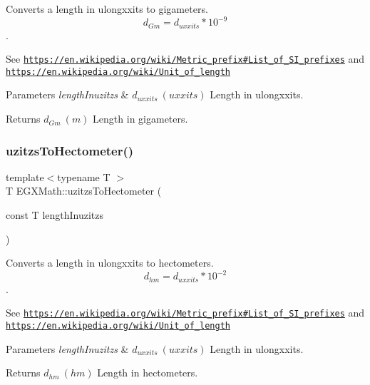 Converts a length in ulongxxits to gigameters. \[ d_{Gm}=d_{uxxits} * 10^{-9} \]. 

See \href{https://en.wikipedia.org/wiki/Metric_prefix#List_of_SI_prefixes}{\tt https\+://en.\+wikipedia.\+org/wiki/\+Metric\+\_\+prefix\#\+List\+\_\+of\+\_\+\+S\+I\+\_\+prefixes} and \href{https://en.wikipedia.org/wiki/Unit_of_length}{\tt https\+://en.\+wikipedia.\+org/wiki/\+Unit\+\_\+of\+\_\+length} 
\begin{DoxyParams}{Parameters}
{\em length\+Inuzitzs} & $ d_{uxxits}\ (uxxits)$ Length in ulongxxits. \\
\hline
\end{DoxyParams}
\begin{DoxyReturn}{Returns}
$ d_{Gm}\ (m)$ Length in gigameters. 
\end{DoxyReturn}
\mbox{\label{group___e_g_x_math-_conversions-_length_conversions-uzitzs-_s_i_gabc1973b8ea47e021bd981f94ac1f254d}} 
\subsubsection{\texorpdfstring{uzitzs\+To\+Hectometer()}{uzitzsToHectometer()}}
{\footnotesize\ttfamily template$<$typename T $>$ \\
T E\+G\+X\+Math\+::uzitzs\+To\+Hectometer (\begin{DoxyParamCaption}\item[{const T}]{length\+Inuzitzs }\end{DoxyParamCaption})}



Converts a length in ulongxxits to hectometers. \[ d_{hm}=d_{uxxits} * 10^{-2} \]. 

See \href{https://en.wikipedia.org/wiki/Metric_prefix#List_of_SI_prefixes}{\tt https\+://en.\+wikipedia.\+org/wiki/\+Metric\+\_\+prefix\#\+List\+\_\+of\+\_\+\+S\+I\+\_\+prefixes} and \href{https://en.wikipedia.org/wiki/Unit_of_length}{\tt https\+://en.\+wikipedia.\+org/wiki/\+Unit\+\_\+of\+\_\+length} 
\begin{DoxyParams}{Parameters}
{\em length\+Inuzitzs} & $ d_{uxxits}\ (uxxits)$ Length in ulongxxits. \\
\hline
\end{DoxyParams}
\begin{DoxyReturn}{Returns}
$ d_{hm}\ (hm)$ Length in hectometers. 
\end{DoxyReturn}
\mbox{\label{group___e_g_x_math-_conversions-_length_conversions-uzitzs-_s_i_ga43a39eb66f3250c955de8fb2beff314c}} 
